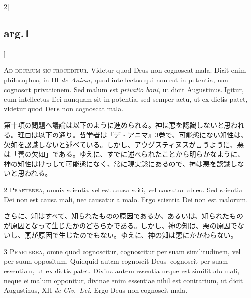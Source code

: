 \documentclass[paper=a4paper,fontsize=10pt,jafontsize=9pt,titlepage]{jlreq}
\begin{document}
\begin{paracol}{2}[\subsection{arg.1}]

{\huge A}{\scshape d decimum sic proceditur}. Videtur quod Deus non
cognoscat mala. Dicit enim philosophus, in III {\itshape de Anima},
quod intellectus qui non est in potentia, non cognoscit
privationem. Sed malum est {\itshape privatio boni}, ut dicit
Augustinus. Igitur, cum intellectus Dei nunquam sit in potentia, sed
semper actu, ut ex dictis patet, videtur quod Deus non cognoscat mala.

\switchcolumn

第十項の問題へ議論は以下のように進められる。神は悪を認識しないと思われ
る。理由は以下の通り。哲学者は『デ・アニマ』3巻で、可能態にない知性は、
欠如を認識しないと述べている。しかし、アウグスティヌスが言うように、悪
は「善の欠如」である。ゆえに、すでに述べられたことから明らかなように、
神の知性はけっして可能態になく、常に現実態にあるので、神は悪を認識しな
いと思われる。


{\scshape 2 Praeterea}, omnis scientia vel est causa sciti, vel
causatur ab eo. Sed scientia Dei non est causa mali, nec causatur a
malo. Ergo scientia Dei non est malorum.

\switchcolumn

さらに、知はすべて、知られたものの原因であるか、あるいは、知られたもの
が原因となって生じたかのどちらかである。しかし、神の知は、悪の原因でな
いし、悪が原因で生じたのでもない。ゆえに、神の知は悪にかかわらない。


{\scshape 3 Praeterea}, omne quod cognoscitur, cognoscitur per suam
similitudinem, vel per suum oppositum. Quidquid autem cognoscit Deus,
cognoscit per suam essentiam, ut ex dictis patet. Divina autem
essentia neque est similitudo mali, neque ei malum opponitur, divinae
enim essentiae nihil est contrarium, ut dicit Augustinus, XII
{\itshape de Civ.~Dei}. Ergo Deus non cognoscit mala.


\end{paracol}
\end{document}
